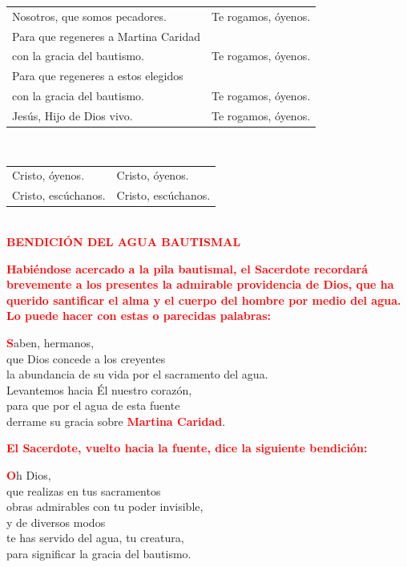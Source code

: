 \documentclass[12pt, letterpaper]{report}
\begin{document}
\begin{tabular}{ll}
Nosotros, que somos pecadores.& Te rogamos, \'oyenos. \\
Para que regeneres a Martina Caridad \\
con la gracia del bautismo.& Te rogamos, \'oyenos. \\
Para que regeneres a estos elegidos \\
con la gracia del bautismo.& Te rogamos, \'oyenos. \\
Jes\'us, Hijo de Dios vivo.& Te rogamos, \'oyenos.
\end{tabular} \newline \\

\begin{tabular}{ll}
Cristo, \'oyenos.& Cristo, \'oyenos. \\
Cristo, esc\'uchanos.& Cristo, esc\'uchanos. \\
\end{tabular} \newline \\

\Large {\bfseries \textcolor{red}{BENDICI\'ON DEL AGUA BAUTISMAL}} \newline

\large {\bfseries \textcolor{red}{Habi\'endose acercado a la pila bautismal, el Sacerdote recordar\'a brevemente a los presentes la admirable providencia de Dios, que ha querido santificar el alma y el cuerpo del hombre por medio del agua. Lo puede hacer con estas o parecidas palabras:}} \newline

\lettrine[lines=1]{\bfseries \textcolor{red}{S}}{}\Large aben, hermanos, \\ 
que Dios concede a los creyentes \\
la abundancia de su vida por el sacramento del agua. \\
Levantemos hacia \'El nuestro coraz\'on, \\
para que por el agua de esta fuente \\
derrame su gracia sobre {\bfseries \textcolor{red}{Martina Caridad}}. \newline

\large {\bfseries \textcolor{red}{El Sacerdote, vuelto hacia la fuente, dice la siguiente bendici\'on:}} \newline

\lettrine[lines=1]{\bfseries \textcolor{red}{O}}{}\Large h Dios, \\
que realizas en tus sacramentos \\
obras admirables con tu poder invisible, \\
y de diversos modos \\
te has servido del agua, tu creatura, \\
para significar la gracia del bautismo. \newline
\end{document}
